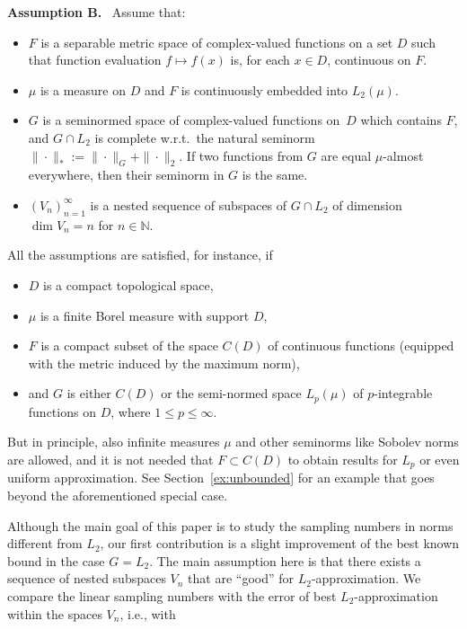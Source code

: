 \documentclass[a4paper,12pt]{amsart}
\theoremstyle{definition}
\theoremstyle{remark}
\begin{document}
\noindent\textbf{Assumption B.} \ Assume that:
\vspace*{-3pt}
\begin{itemize}
    \item[(B.1)] $F$ is a separable metric space of complex-valued functions on a set $D$ such that function evaluation $f\mapsto f(x)$ is, for each $x\in D$, continuous on $F$.
    \item[(B.2)] $\mu$ is a measure on $D$ and $F$ is continuously embedded into $L_2(\mu)$.
   \item[(B.3)] 
    $G$ is a seminormed space  {of complex-valued functions on~$D$} which contains $F$, and $G\cap L_2$ is complete w.r.t.~the natural seminorm $\|\cdot\|_*:=\|\cdot\|_G+\|\cdot\|_2$. %
   If two functions from $G$ are equal $\mu$-almost everywhere, then their seminorm in $G$ is the same.
   \item[(B.4)] $(V_n)_{n=1}^\infty$ is a 
   nested sequence of subspaces of $G \cap L_2$ of 
   dimension
    {$\dim V_n = n$ for $n\in \mathbb{N}$.}
    \end{itemize}

All the assumptions are satisfied, for instance, if
\begin{itemize}
    \item $D$ is a compact topological space, 
    \item $\mu$ is a {finite} Borel
    measure with support $D$, 
        \item $F$ is a compact subset of the space $C(D)$ of continuous functions (equipped with the metric induced by the maximum norm), 
    \item and $G$ is either $C(D)$ or the semi-normed space $L_p(\mu)$ of $p$-integrable functions on $D$, where $1\le p \le \infty$.
\end{itemize}
 But in principle, also infinite measures $\mu$ and other seminorms like 
 Sobolev norms 
 are allowed, and it is not needed that $F\subset C(D)$ to obtain results for $L_p$ or even uniform approximation. See Section~\ref{ex:unbounded} for an example that goes beyond the aforementioned special case.




Although the main goal of this paper is to study the sampling numbers in norms different from $L_2$, our first contribution is a slight improvement of the best known bound in the case $G=L_2$.
The main assumption here is that there exists a sequence of  {nested} subspaces 
$V_n$ 
that are ``good'' for $L_2$-approximation. We compare the linear sampling numbers with the error of best $L_2$-approximation within the spaces $V_n$, i.e., with 
\end{document}
